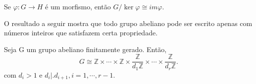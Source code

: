 \documentclass[Algebra/algebra_notes.tex]{subfiles}
\begin{document}
\begin{crl*}
	Se $\varphi:G\rightarrow H$ é um morfismo, então $G/\ker{\varphi}\cong im\varphi.$
\end{crl*}

O resultado a seguir mostra que todo grupo abeliano pode ser escrito apenas com números inteiros que satisfazem certa propriedade.
\begin{theorem*}
	Seja G um grupo abeliano finitamente gerado. Então,
	$$
		G\cong{} \mathbb{Z}\times \cdots\times \mathbb{Z}\times \frac{\mathbb{Z}}{d_{1}\mathbb{Z}}\times \cdots\times \frac{\mathbb{Z}}{d_{r} \mathbb{Z}}.
	$$
	com $d_{i} > 1$ e $d_{i}\bigl|\bigr. d_{i+1}, i=1,\cdots,r-1.$
\end{theorem*}
\end{document}
